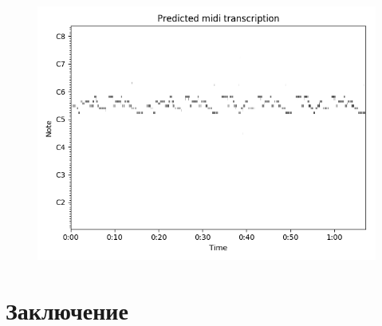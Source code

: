 \documentclass[unicode]{beamer}
\begin{document}
\begin{frame}
\begin{figure}
    \includegraphics[scale=.64]
      {res/daj-ci-boze-dobranoc-overfit-028-acoustic.png}
\end{figure}
\end{frame}

\section{Заключение}

\begin{frame}
\end{frame}
\end{document}
